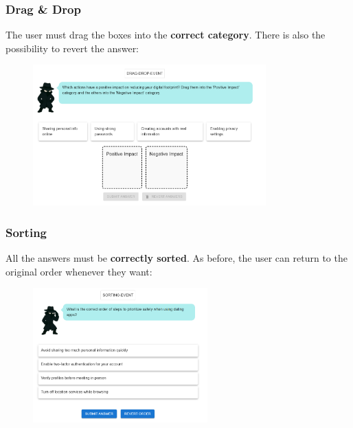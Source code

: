 \subsubsection{Drag \& Drop}\label{qt:dad}
The user must drag the boxes into the \textbf{correct category}. There is also the possibility to revert the answer:
\begin{figure}[htbp]
    \centering
    \includegraphics[width=0.8\textwidth]{images/Drag_and_Drop.png}
\end{figure}

\subsubsection{Sorting}\label{qt:sort}
All the answers must be \textbf{correctly sorted}. As before, the user can return to the original order whenever they want:
\begin{figure}[htbp]
    \centering
    \includegraphics[width=0.6\textwidth]{images/Sorting.png}
\end{figure}
\pagebreak

